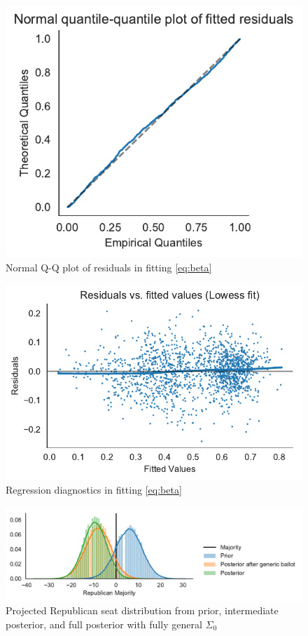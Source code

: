 \documentclass[11pt]{article}
\begin{document}
\begin{figure}[tbh]
  \centering
  \includegraphics{qq.pdf}
  \caption{Normal Q-Q plot of residuals in fitting \eqref{eq:beta}}
  \label{fig:qq}
\end{figure}

\begin{figure}[tbh]
  \centering
  \includegraphics{diagnostics.pdf}
  \caption{Regression diagnostics in fitting \eqref{eq:beta}}
  \label{fig:diag}
\end{figure}

\begin{figure}[tbh]
  \centering
  \includegraphics[width=\textwidth]{rep_seats.pdf}
  \caption{Projected Republican seat distribution from prior, intermediate
  posterior, and full posterior with fully general $\Sigma_0$}
  \label{fig:hists}
\end{figure}
\end{document}
